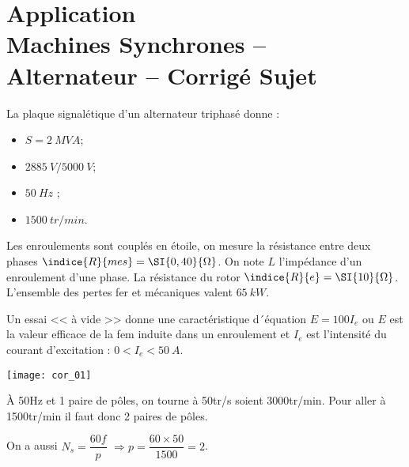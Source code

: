 \chapter*{Application  \\ 
Machines Synchrones -- Alternateur
-- \ifprof Corrigé \else Sujet \fi}

\iflivret {} \else
\ifprof  {} \else \fi
\fi

\setcounter{question}{0}


La plaque signalétique d'un alternateur triphasé donne : 
\begin{itemize}
\item $S =\SI{2}{MVA}$; 
\item $\SI{2885}{V}/\SI{5000}{V}$;
\item $\SI{50}{Hz}$ ;
\item $\SI{1500}{tr/min}$.
\end{itemize}

Les enroulements sont couplés en étoile, on mesure la résistance entre deux phases $\indice{R}{mes}=\SI{0,40}{\Omega}$.
On note $L$ l'impédance d'un enroulement d'une phase.
La résistance du rotor $\indice{R}{e}=\SI{10}{\Omega}$.
L’ensemble des pertes fer et mécaniques valent $\SI{65}{kW}$.


Un essai << à vide >> donne une caractéristique d´équation $E = 100I_e$ ou $E$ est la valeur efficace de la fem induite dans un enroulement et $I_e$ est l’intensité du courant d’excitation : $0 < I_e < \SI{50}{A}$.


\ifprof
\begin{marginfigure}
\texttt{[image: cor\_01]}
\end{marginfigure}

\begin{corrige}
À \si{50}{Hz} et 1 paire de pôles, on tourne à  \si{50}{tr/s} soient \si{3000}{tr/min}.  Pour aller à \si{1500}{tr/min} il faut donc 2 paires de pôles. 

On a aussi $N_s = \dfrac{60f}{p}$ $\Rightarrow p =\dfrac{60\times 50}{1500} = 2$.
\end{corrige}
\else
\fi

